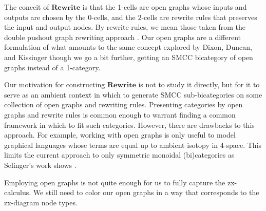 The conceit of $\mathbf{Rewrite}$ 
is that the 1-cells are open graphs 
whose inputs and outputs are 
chosen by the $0$-cells, 
and the $2$-cells are 
rewrite rules that preserves 
the input and output nodes.
By rewrite rules, we mean those 
taken from the 
double pushout graph rewriting 
approach \cite{Corradini_AlgApprGraphTrans}.
Our open graphs are 
a different formulation
of what amounts to the same concept
explored by Dixon, Duncan, and Kissinger
	\cite{Dixon_OpenGraphs}
though we go a bit further, 
getting an SMCC bicategory
of open graphs instead of a 1-category.
 
Our motivation for constructing $\mathbf{Rewrite}$ 
is not to study it directly, 
but for it to serve 
as an ambient context in which 
to generate SMCC sub-bicategories 
on some collection of open graphs 
and rewriting rules. 
Presenting categories by
open graphs and rewrite rules
is common enough
	\cite{Dixon_OpenGraphs,Fong_AlgOpenSystems,Pollard_OpenMarkov}
to warrant finding a common
framework in which to fit such categories.
However, there are drawbacks to this approach. 
For example, working with open graphs 
is only useful to model graphical languages 
whose terms are equal 
up to ambient isotopy in $4$-space.
This limits the current approach to 
only symmetric monoidal (bi)categories 
as Selinger's work shows
	\cite{Selinger_GraphicsMonCats}.
	
Employing open graphs is 
not quite enough for us
to fully capture the zx-calculus.
We still need to color
our open graphs in a way
that corresponds to the
zx-diagram node types.


